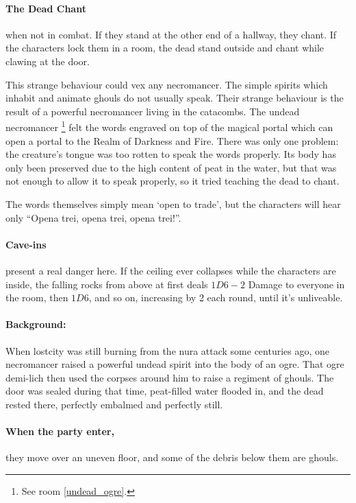 \begin{multicols}{2}
\paragraph{The Dead Chant} when not in combat.
If they stand at the other end of a hallway, they chant.
If the characters lock them in a room, the dead stand outside and chant while clawing at the door.

This strange behaviour could vex any necromancer.
The simple spirits which inhabit and animate ghouls do not usually speak.
Their strange behaviour is the result of a powerful necromancer living in the catacombs.
The undead necromancer%
\footnote{See room \ref{undead_ogre}.}
felt the words engraved on top of the magical portal which can open a portal to the Realm of Darkness and Fire.
There was only one problem: the creature's tongue was too rotten to speak the words properly.
Its body has only been preserved due to the high content of peat in the water, but that was not enough to allow it to speak properly, so it tried teaching the dead to chant.

The words themselves simply mean `open to trade', but the characters will hear only ``Opena trei, opena trei, opena trei!''.

\paragraph{Cave-ins} present a real danger here.  If the ceiling ever collapses while the characters are inside, the falling rocks from above at first deals $1D6-2$ Damage to everyone in the room, then $1D6$, and so on, increasing by 2 each round, until it's unliveable.


\paragraph{Background:}
When \gls{lostcity} was still burning from the nura attack some centuries ago, one necromancer raised a powerful undead spirit into the body of an ogre.
That ogre demi-lich then used the corpses around him to raise a regiment of ghouls.
The door was sealed during that time, peat-filled water flooded in, and the dead rested there, perfectly embalmed and perfectly still.

\paragraph{When the party enter,}
they move over an uneven floor, and some of the debris below them are ghouls.


\end{multicols}
